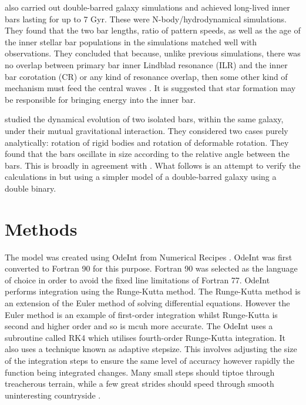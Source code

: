 \documentclass[a4paper,12pt]{article}
\begin{document}
\cite{wozniak} also carried out double-barred galaxy simulations and achieved long-lived inner bars lasting for up to 7 Gyr. These were N-body/hydrodynamical simulations. They found that the two bar lengths, ratio of
pattern speeds, as well as the age of the inner stellar bar populations in the simulations matched well with observations. They concluded that because, unlike previous simulations, there was no overlap between primary bar 
inner Lindblad resonance (ILR) and the inner bar corotation (CR) or any kind of resonance overlap, then some other kind of mechanism must feed the central waves \citep{wozniak}. It is suggested that star 
formation may be responsible for bringing energy into the inner bar.

\cite{garzon} studied the dynamical evolution of two isolated bars, within the same galaxy, under their mutual gravitational interaction. They considered two cases purely analytically: rotation of rigid bodies and
rotation of deformable rotation. They found that the bars oscillate in size according to the relative angle between the bars. This is broadly in agreement with \citep{debattista}.
What follows is an attempt to verify the calculations in \citep{garzon} but using a simpler model of a double-barred galaxy using a double binary.
\newpage
\section{Methods}
The model was created using OdeInt from Numerical Recipes \citep{press}. OdeInt was first converted to Fortran 90 for this purpose.
Fortran 90 was selected as the language of choice in order to avoid the fixed line limitations of Fortran 77.
OdeInt performs integration using the Runge-Kutta method. The Runge-Kutta method is an extension of the Euler method of solving differential equations. However the Euler method
is an example of first-order integration whilst Runge-Kutta is second and higher order and so is mcuh more accurate. The OdeInt uses a subroutine called RK4 which utilises fourth-order Runge-Kutta integration.
It also uses a technique known as adaptive stepsize. This involves adjusting the size of the integration steps to ensure the same level of accuracy however rapidly the function being integrated changes.
Many small steps should tiptoe through treacherous terrain, while a few great strides should speed through smooth uninteresting countryside \citep{press}.
\end{document}
